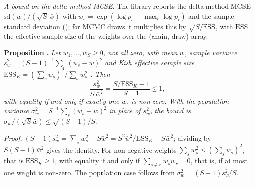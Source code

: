 \emph{A bound on the delta-method MCSE.}
The library reports the delta-method MCSE $\mathrm{sd}(w)/(\sqrt{S}\,\bar w)$ with $w_s = \exp(\log
p_s - \max_r \log p_r)$ and the sample standard deviation (); for MCMC draws it
multiplies this by $\sqrt{S/\mathrm{ESS}}$, with $\mathrm{ESS}$ the effective sample size of the
weights over the (chain, draw) array.

\medskip\noindent\textbf{Proposition \thesubsection.}\label{prop:mcse-bound} \textit{Let $w_1, \dots, w_S \ge 0$, not all zero, with
mean $\bar w$, sample variance $s_w^2 = (S-1)^{-1}\sum_s (w_s - \bar w)^2$ and Kish effective sample
size $\mathrm{ESS}_K = (\sum_s w_s)^2/\sum_s w_s^2$ \citep{kish1965survey}. Then}
\begin{equation}\label{eq:mcse-bound}
\frac{s_w^2}{S\,\bar w^2} = \frac{S/\mathrm{ESS}_K - 1}{S - 1} \le 1,
\end{equation}
\textit{with equality if and only if exactly one $w_s$ is non-zero. With the population variance
$\sigma_w^2 = S^{-1}\sum_s(w_s - \bar w)^2$ in place of $s_w^2$, the bound is $\sigma_w/(\sqrt{S}\bar
w) \le \sqrt{(S-1)/S}$.}

\noindent\textit{Proof.}
$(S-1)s_w^2 = \sum_s w_s^2 - S\bar w^2 = S^2\bar w^2/\mathrm{ESS}_K - S\bar w^2$; dividing by
$S(S-1)\bar w^2$ gives the identity.
For non-negative weights $\sum_s w_s^2 \le (\sum_s w_s)^2$, that is $\mathrm{ESS}_K \ge 1$, with
equality if and only if $\sum_{s \ne r} w_s w_r = 0$, that is, if at most one weight is non-zero.
The population case follows from $\sigma_w^2 = (S-1)s_w^2/S$.
\hfill\rule{0.5em}{0.5em}

